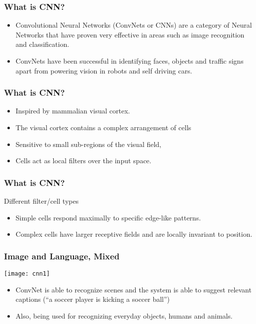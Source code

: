 \begin{frame}[fragile] \frametitle{What is CNN?}

\begin{itemize}
\item Convolutional Neural Networks (ConvNets or CNNs) are a category of Neural Networks that have proven very effective in areas such as image recognition and classification.
\item ConvNets have been successful in identifying faces, objects and traffic signs apart from powering vision in robots and self driving cars.
\end{itemize}
\end{frame}



\begin{frame}[fragile] \frametitle{What is CNN?}

\begin{itemize}
\item Inspired by mammalian visual cortex.
\item The visual cortex contains a complex arrangement of cells
\item Sensitive to small sub-regions of the visual field, 
\item Cells act as local filters over the input space.
\end{itemize}
\end{frame}

\begin{frame}[fragile] \frametitle{What is CNN?}

Different filter/cell types
\begin{itemize}
\item Simple cells respond maximally to specific edge-like patterns.
\item Complex cells have larger receptive fields and are locally invariant to position.

\end{itemize}
\end{frame}


\begin{frame}[fragile] \frametitle{Image and Language, Mixed}


\begin{center}
\texttt{[image: cnn1]}
\end{center}

 \begin{itemize}
\item  ConvNet is able to recognize scenes and the system is able to suggest relevant captions (``a soccer player is kicking a soccer ball'')
\item Also, being used for recognizing everyday objects, humans and animals.
\end{itemize}
\end{frame}


